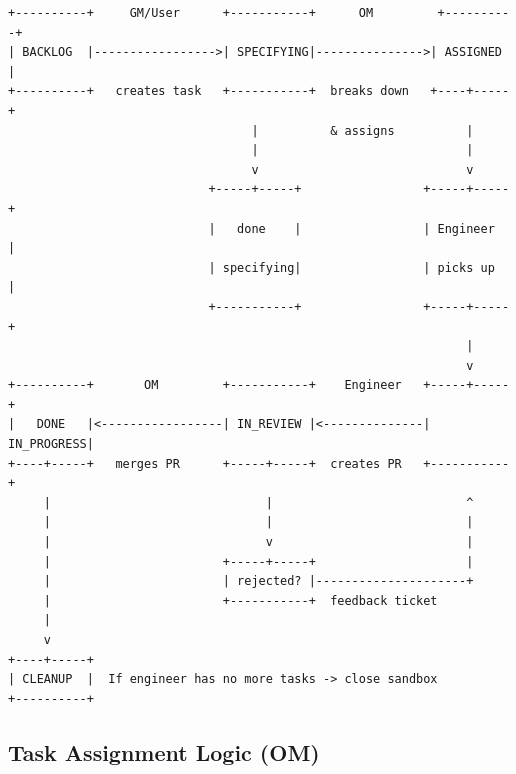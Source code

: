 \documentclass[11pt,a4paper]{article}
\begin{document}
\begin{verbatim}
+----------+     GM/User      +-----------+      OM         +----------+
| BACKLOG  |----------------->| SPECIFYING|--------------->| ASSIGNED |
+----------+   creates task   +-----------+  breaks down   +----+-----+
                                  |          & assigns          |
                                  |                             |
                                  v                             v
                            +-----+-----+                 +-----+-----+
                            |   done    |                 | Engineer  |
                            | specifying|                 | picks up  |
                            +-----------+                 +-----+-----+
                                                                |
                                                                v
+----------+       OM         +-----------+    Engineer   +-----+-----+
|   DONE   |<-----------------| IN_REVIEW |<--------------| IN_PROGRESS|
+----+-----+   merges PR      +-----+-----+  creates PR   +-----------+
     |                              |                           ^
     |                              |                           |
     |                              v                           |
     |                        +-----+-----+                     |
     |                        | rejected? |---------------------+
     |                        +-----------+  feedback ticket
     |
     v
+----+-----+
| CLEANUP  |  If engineer has no more tasks -> close sandbox
+----------+
\end{verbatim}

\subsection{Task Assignment Logic (OM)}
\end{document}
